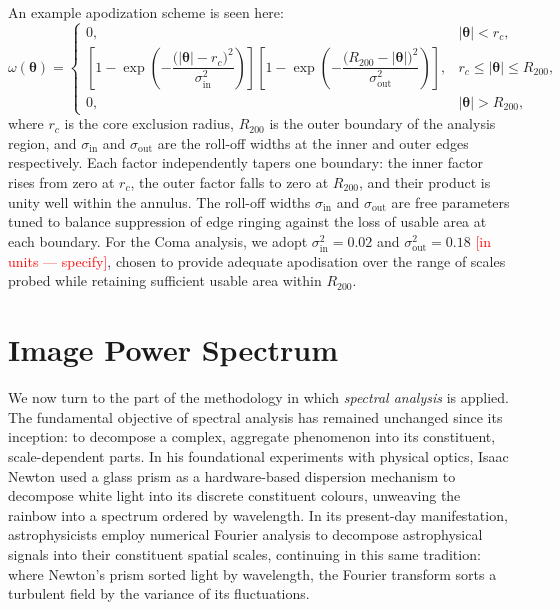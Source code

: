 An example apodization scheme is seen here:
%
\begin{equation}
	\omega(\boldsymbol{\theta}) =
	\begin{cases}
		0, & |\boldsymbol{\theta}| < r_c, \\[10pt]
		\left[
		1 - \exp\!\left(
		-\dfrac{\bigl(|\boldsymbol{\theta}| - r_c\bigr)^2}
		{\sigma_{\mathrm{in}}^2}
		\right)
		\right]
		\left[
		1 - \exp\!\left(
		-\dfrac{\bigl(R_{200} - |\boldsymbol{\theta}|\bigr)^2}
		{\sigma_{\mathrm{out}}^2}
		\right)
		\right],
		& r_c \leq |\boldsymbol{\theta}| \leq R_{200}, \\[12pt]
		0, & |\boldsymbol{\theta}| > R_{200},
	\end{cases}
	\label{eq:apodizationMask}
\end{equation}
%
where $r_c$ is the core exclusion radius, $R_{200}$ is the outer boundary of the analysis region, and $\sigma_{\mathrm{in}}$ and $\sigma_{\mathrm{out}}$ are the roll-off widths at the inner and outer edges respectively. Each factor independently tapers one boundary: the inner factor rises from zero at $r_c$, the outer factor falls to zero at $R_{200}$, and their product is unity well within the annulus. The roll-off widths $\sigma_{\mathrm{in}}$ and $\sigma_{\mathrm{out}}$ are free parameters tuned to balance suppression of edge ringing against the loss of usable area at each boundary. For the Coma analysis, we adopt $\sigma_{\mathrm{in}}^2 = 0.02$ and $\sigma_{\mathrm{out}}^2 = 0.18$ \textcolor{red}{[in units — specify]}, chosen to provide adequate apodisation over the range of scales probed while retaining sufficient usable area within $R_{200}$.

\newpage
\section{Image Power Spectrum}\label{Chap:assumptionsImageToPowerSpectrum}

We now turn to the part of the methodology in which \textit{spectral analysis} is applied. The fundamental objective of spectral analysis has remained unchanged since its inception: to decompose a complex, aggregate phenomenon into its constituent, scale-dependent parts. In his foundational experiments with physical optics, Isaac Newton used a glass prism as a hardware-based dispersion mechanism to decompose white light into its discrete constituent colours, unweaving the rainbow into a spectrum ordered by wavelength. In its present-day manifestation, astrophysicists employ numerical Fourier analysis to decompose astrophysical signals into their constituent spatial scales, continuing in this same tradition: where Newton's prism sorted light by wavelength, the Fourier transform sorts a turbulent field by the variance of its fluctuations.

